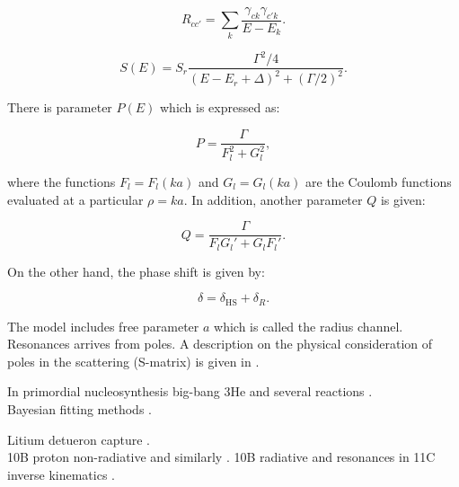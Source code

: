 \documentclass[openany]{book}
\begin{document}
\begin{equation}
	R_{cc'} = \sum_k {\frac{\gamma_{ck} \gamma_{c'k}}{E - E_k}}.
\end{equation}

\begin{equation}
	S(E) = S_r \frac{\Gamma^2/4}{(E-E_r + \Delta)^2 + (\Gamma/2)^2}.
\end{equation}

There is parameter $P(E)$ which is expressed as: 

\begin{equation}
	P= \frac{\Gamma}{F_l^2 + G_l^2},
\end{equation}

where the functions $F_l = F_l(ka)$ and $G_l = G_l(ka)$ are the Coulomb functions evaluated at a particular $\rho = ka$. In addition, another parameter $Q$ is given: 

\begin{equation}
	Q = \frac{\Gamma}{F_lG_l' + G_lF_l'}.
\end{equation}

On the other hand, the phase shift is given by:

\begin{equation}
	\delta = \delta_{\mathrm{HS}} + \delta_R.
\end{equation}

The model includes free parameter $a$ which is called the radius channel. \\

Resonances arrives from poles. A description on the physical consideration of poles in the scattering (S-matrix) is given in \cite{ramirezjimenez_kelkar_2018}.


In primordial nucleosynthesis \cite{desouza_iliadis_coc_2019} big-bang 3He and several reactions \cite{sparta_pizzone_bertulani_hou_lamia_tumino_2020}. \\

Bayesian fitting methods \cite{odell_brune_phillips_2022}.

Litium detueron capture \cite{grineviciute_lamia_mukhamedzhanov_spitaleri_lacognata_2015}. \\

10B proton non-radiative \cite{kolk_macon_deboer_anderson_boeltzig_brandenburg_brune_chen_clark_danley_et_2022} and similarly \cite{sieverding_randhawa_zetterberg_deboer_ahn_mancino_martinez-pinedo_hix_2022}. 10B radiative and resonances in 11C inverse kinematics \cite{kaur_guimaraes_zamora_assuncao_alcantara-nunez_delara_zevallos_ribeiro_lichtenthaler_pires_et_2022}.
\end{document}
